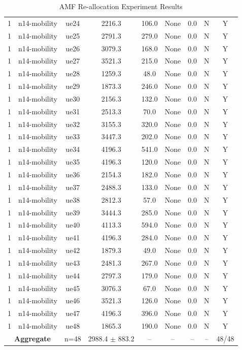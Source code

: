 \begin{table}[ht]
\begin{tabular}{|c|c|c|c|c|c|c|c|c|}
1 & n14-mobility & ue24 & 2216.3 & 106.0 & None & 0.0 & N & Y \\
1 & n14-mobility & ue25 & 2791.3 & 279.0 & None & 0.0 & N & Y \\
1 & n14-mobility & ue26 & 3079.3 & 168.0 & None & 0.0 & N & Y \\
1 & n14-mobility & ue27 & 3521.3 & 215.0 & None & 0.0 & N & Y \\
1 & n14-mobility & ue28 & 1259.3 & 48.0 & None & 0.0 & N & Y \\
1 & n14-mobility & ue29 & 1873.3 & 246.0 & None & 0.0 & N & Y \\
1 & n14-mobility & ue30 & 2156.3 & 132.0 & None & 0.0 & N & Y \\
1 & n14-mobility & ue31 & 2513.3 & 70.0 & None & 0.0 & N & Y \\
1 & n14-mobility & ue32 & 3155.3 & 320.0 & None & 0.0 & N & Y \\
1 & n14-mobility & ue33 & 3447.3 & 202.0 & None & 0.0 & N & Y \\
1 & n14-mobility & ue34 & 4196.3 & 541.0 & None & 0.0 & N & Y \\
1 & n14-mobility & ue35 & 4196.3 & 120.0 & None & 0.0 & N & Y \\
1 & n14-mobility & ue36 & 2154.3 & 182.0 & None & 0.0 & N & Y \\
1 & n14-mobility & ue37 & 2488.3 & 133.0 & None & 0.0 & N & Y \\
1 & n14-mobility & ue38 & 2812.3 & 57.0 & None & 0.0 & N & Y \\
1 & n14-mobility & ue39 & 3444.3 & 285.0 & None & 0.0 & N & Y \\
1 & n14-mobility & ue40 & 4113.3 & 594.0 & None & 0.0 & N & Y \\
1 & n14-mobility & ue41 & 4196.3 & 284.0 & None & 0.0 & N & Y \\
1 & n14-mobility & ue42 & 1879.3 & 49.0 & None & 0.0 & N & Y \\
1 & n14-mobility & ue43 & 2481.3 & 267.0 & None & 0.0 & N & Y \\
1 & n14-mobility & ue44 & 2797.3 & 179.0 & None & 0.0 & N & Y \\
1 & n14-mobility & ue45 & 3076.3 & 67.0 & None & 0.0 & N & Y \\
1 & n14-mobility & ue46 & 3521.3 & 126.0 & None & 0.0 & N & Y \\
1 & n14-mobility & ue47 & 4196.3 & 396.0 & None & 0.0 & N & Y \\
1 & n14-mobility & ue48 & 1865.3 & 190.0 & None & 0.0 & N & Y \\
\multicolumn{2}{|c|}{\textbf{Aggregate}} & n=48 & 2988.4 $\pm$ 883.2 & -- & -- & -- & -- & 48/48 \\
\hline
\end{tabular}
\caption{AMF Re-allocation Experiment Results}
\label{tab:amf_realloc}
\end{table}
